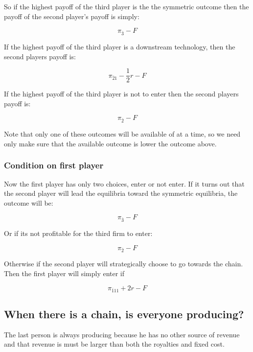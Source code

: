 \documentclass{article}
\begin{document}
So if the highest payoff of the third player is the the symmetric outcome then the payoff of the second player's payoff is simply: 

\begin{equation*}
\pi_{\overline{3}}-F
\end{equation*}

If the highest payoff of the third player is a downstream technology, then the second players payoff is:

\begin{equation*}
\pi_{\overline{2}1} - \frac{1}{2}r-F
\end{equation*}

If the highest payoff of the third player is not to enter then the second players payoff is:

\begin{equation*}
\pi_{\overline{2}}-F
\end{equation*}

Note that only one of these outcomes will be available of at a time, so we need only make sure that the available outcome is lower the outcome above. 

\subsubsection{Condition on first player}

Now the first player has only two choices, enter or not enter. If it turns out that the second player will lead the equilibria toward the symmetric equilibria, the outcome will be:

\begin{equation*}
\pi_{\overline{3}} -F 
\end{equation*}

Or if its not profitable for the third firm to enter:

\begin{equation*}
\pi_{\overline{2}} -F 
\end{equation*}

Otherwise if the second player will strategically choose to go towards the chain. Then the first player will simply enter if 

\begin{equation*}
\pi_{\overline{1}11}+2r-F
\end{equation*}

\subsection{When there is a chain, is everyone producing?}
The last person is always producing because he has no other source of revenue and that revenue is must be larger than both the royalties and fixed cost.
\end{document}
